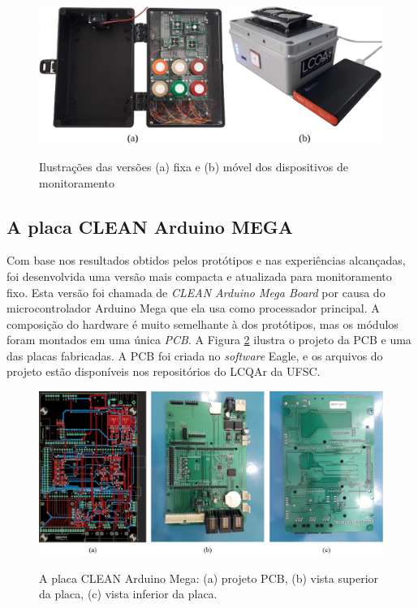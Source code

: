 \begin{figure}
    \centering
    \caption{Ilustrações das versões (a) fixa e (b) móvel dos dispositivos de monitoramento}
    \includegraphics[width=1\linewidth]{chapters//2-CLEAN/Figuras/Monitoring Prototypes.jpg}
    \label{fig:monitoring-prototypes}
\end{figure}

\subsection{A placa CLEAN Arduino MEGA}

Com base nos resultados obtidos pelos protótipos e nas experiências alcançadas, foi desenvolvida uma versão mais compacta e atualizada para monitoramento fixo. Esta versão foi chamada de \textit{CLEAN Arduino Mega Board} por causa do microcontrolador Arduino Mega que ela usa como processador principal. A composição do hardware é muito semelhante à dos protótipos, mas os módulos foram montados em uma única \textit{PCB}. A Figura \ref{fig:clean-arduino-mega-board} ilustra o projeto da PCB e uma das placas fabricadas. A PCB foi criada no \textit{software} Eagle, e os arquivos do projeto estão disponíveis nos repositórios do LCQAr da UFSC.

\begin{figure}
    \centering
    \caption{A placa CLEAN Arduino Mega: (a) projeto PCB, (b) vista superior da placa, (c) vista inferior da placa.}
    \includegraphics[width=1\linewidth]{chapters//2-CLEAN/Figuras/CLEAN Arduino Mega Board.jpg}
    \label{fig:clean-arduino-mega-board}
\end{figure}

